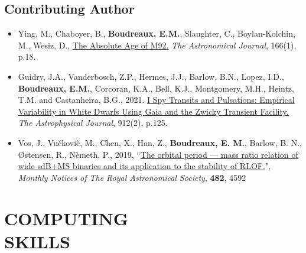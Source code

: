 \documentclass[margin, 10pt]{res} %
\begin{document}
\begin{resume}
\subsection{Contributing Author}
\begin{itemize}
  \item Ying, M., Chaboyer, B., \textbf{Boudreaux, E.M.}, Slaughter, C., Boylan-Kolchin, M., Wesiz, D., \href{https://ui.adsabs.harvard.edu/abs/2023AJ....166...18Y/abstract}{The Absolute Age of M92.} \textit{The Astronomical Journal}, 166(1), p.18.
	\item Guidry, J.A., Vanderbosch, Z.P., Hermes, J.J., Barlow, B.N., Lopez, I.D., \textbf{Boudreaux, E.M.}, Corcoran, K.A., Bell, K.J., Montgomery, M.H., Heintz, T.M. and Castanheira, B.G., 2021. \href{https://ui.adsabs.harvard.edu/abs/2021ApJ...912..125G/abstract}{I Spy Transits and Pulsations: Empirical Variability in White Dwarfs Using Gaia and the Zwicky Transient Facility.} \textit{The Astrophysical Journal}, 912(2), p.125.
\item Vos, J., Vu\u{c}kovi\`c, M., Chen, X., Han, Z., \textbf{Boudreaux, E. M.}, Barlow, B. N., \O stensen, R., N\`emeth, P., 2019, ``\href{https://ui.adsabs.harvard.edu/#abs/2019MNRAS.482.4592V/abstract}{The orbital period --- mass ratio relation of wide sdB+MS binaries and its application to the stability of RLOF.}", \textit{Monthly Notices of The Royal Astronomical Society}, \textbf{482}, 4592 
\end{itemize}


\section{COMPUTING \\ SKILLS} 


\end{resume}
\end{document}
